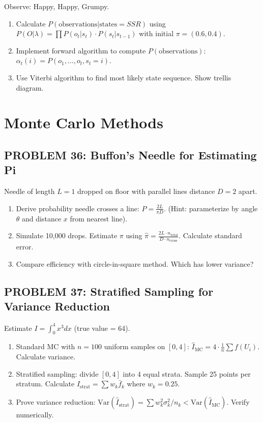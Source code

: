 \documentclass[12pt]{article}
\begin{document}
Observe: Happy, Happy, Grumpy.

\begin{enumerate}
\item[(a)] Calculate \(P(\text{observations} | \text{states} = SSR)\) using \(P(O|\lambda) = \prod P(o_t|s_t) \cdot P(s_t|s_{t-1})\) with initial \(\pi = (0.6, 0.4)\).
\item[(b)] Implement forward algorithm to compute \(P(\text{observations})\): \(\alpha_t(i) = P(o_1, \ldots, o_t, s_t=i)\).
\item[(c)] Use Viterbi algorithm to find most likely state sequence. Show trellis diagram.
\end{enumerate}

\newpage
\section*{Monte Carlo Methods}

\subsection*{PROBLEM 36: Buffon's Needle for Estimating Pi}

Needle of length \(L=1\) dropped on floor with parallel lines distance \(D=2\) apart.

\begin{enumerate}
\item[(a)] Derive probability needle crosses a line: \(P = \frac{2L}{\pi D}\). (Hint: parameterize by angle \(\theta\) and distance \(x\) from nearest line).
\item[(b)] Simulate 10,000 drops. Estimate \(\pi\) using \(\hat{\pi} = \frac{2L \cdot n_{\text{total}}}{D \cdot n_{\text{cross}}}\). Calculate standard error.
\item[(c)] Compare efficiency with circle-in-square method. Which has lower variance?
\end{enumerate}

\subsection*{PROBLEM 37: Stratified Sampling for Variance Reduction}

Estimate \(I = \int_0^4 x^3 dx\) (true value = 64).

\begin{enumerate}
\item[(a)] Standard MC with \(n=100\) uniform samples on \([0,4]\): \(\hat{I}_{\text{MC}} = 4\cdot\frac{1}{n}\sum f(U_i)\). Calculate variance.
\item[(b)] Stratified sampling: divide \([0,4]\) into 4 equal strata. Sample 25 points per stratum. Calculate \(\hat{I}_{\text{strat}} = \sum w_k \bar{f}_k\) where \(w_k = 0.25\).
\item[(c)] Prove variance reduction: \(\text{Var}(\hat{I}_{\text{strat}}) = \sum w_k^2 \sigma_k^2/n_k < \text{Var}(\hat{I}_{\text{MC}})\). Verify numerically.
\end{enumerate}
\end{document}

